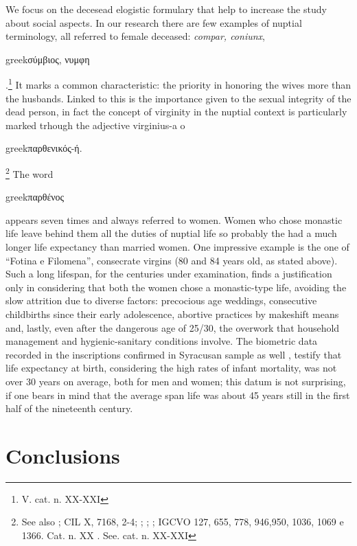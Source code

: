 \documentclass[amsthm,ebook]{saparticle}
\begin{document}
We focus on the decesead elogistic formulary that help to increase the study about social aspects. In our research there are few examples of nuptial terminology, all referred to female deceased: \emph{compar, coniunx}, 
\begin{otherlanguage*}{greek}σύμβιος, νυμφη\end{otherlanguage*}
.\footnote{V. cat. n. XX-XXI} It marks a common characteristic: the priority in honoring the wives more than the husbands. Linked to this is the importance given to the sexual integrity of the dead person, in fact the concept of virginity in the nuptial context is particularly marked trhough the adjective virginius-a o \begin{otherlanguage*}{greek}παρθενικός-ή.\end{otherlanguage*}
\footnote{See also \citet[129-130]{SGARLATA1991} \citet[493]{CARINI1887}; CIL X, 7168, 2-4; \citet[5, 22, 44]{ORSI1893}; \citet[6, 7]{FUHRER1897}; \citep[21/29, 38, 39, 43, 45, 48, 58, 60, 69]{FERRUA1983}; IGCVO 127, 655, 778, 946,950, 1036, 1069 e 1366. Cat. n. XX \citep[214]{ORSI1896}. See. cat. n. XX-XXI} The word \begin{otherlanguage*}{greek}παρθένος\end{otherlanguage*} 
appears seven times and always referred to women. Women who chose monastic life leave behind them all the duties of nuptial life so probably the had a much longer life expectancy than married women. One impressive example is the one of ``Fotina e Filomena'', consecrate virgins (80 and 84 years old, as stated above). Such a long lifespan, for the centuries under examination, finds a justification only in considering that both the women chose a monastic-type life, avoiding the slow attrition due to diverse factors: precocious age weddings, consecutive childbirths since their early adolescence, abortive practices by makeshift means and, lastly, even after the dangerous age of 25/30, the overwork that household management and hygienic-sanitary conditions involve. The biometric data recorded in the inscriptions confirmed in Syracusan sample as well \citep{SGARLATA1991}, testify that life expectancy at birth, considering the high rates of infant mortality, was not over 30 years on average, both for men and women; this datum is not surprising, if one bears in mind that the average span life was about 45 years still in the first half of the nineteenth century.



\section{Conclusions}
\end{document}
